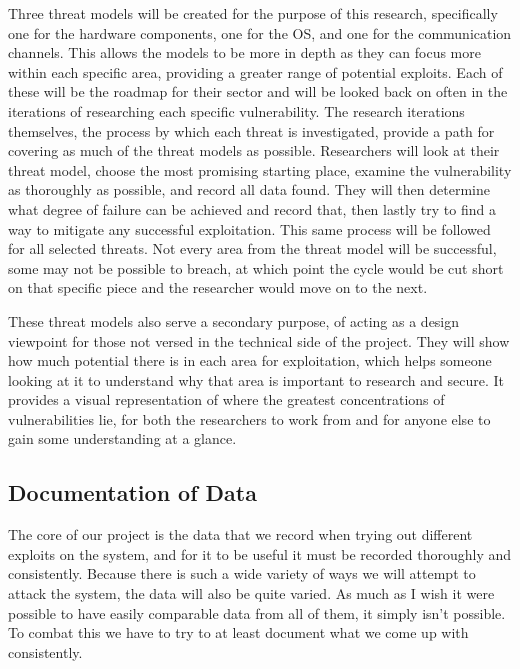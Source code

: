\documentclass[IEEEtran,letterpaper,10pt,notitlepage,draftclsnofoot,onecolumn]{article}
\begin{document}
Three threat models will be created for the purpose of this research, specifically one for the hardware components, one for the OS, and one for the communication channels.
This allows the models to be more in depth as they can focus more within each specific area, providing a greater range of potential exploits.
Each of these will be the roadmap for their sector and will be looked back on often in the iterations of researching each specific vulnerability.
The research iterations themselves, the process by which each threat is investigated, provide a path for covering as much of the threat models as possible.
Researchers will look at their threat model, choose the most promising starting place, examine the vulnerability as thoroughly as possible, and record all data found.
They will then determine what degree of failure can be achieved and record that, then lastly try to find a way to mitigate any successful exploitation.
This same process will be followed for all selected threats.
Not every area from the threat model will be successful, some may not be possible to breach, at which point the cycle would be cut short on that specific piece and the researcher would move on to the next.

These threat models also serve a secondary purpose, of acting as a design viewpoint for those not versed in the technical side of the project.
They will show how much potential there is in each area for exploitation, which helps someone looking at it to understand why that area is important to research and secure.
It provides a visual representation of where the greatest concentrations of vulnerabilities lie, for both the researchers to work from and for anyone else to gain some understanding at a glance.

\subsection{Documentation of Data}
The core of our project is the data that we record when trying out different exploits on the system, and for it to be useful it must be recorded thoroughly and consistently. 
Because there is such a wide variety of ways we will attempt to attack the system, the data will also be quite varied. 
As much as I wish it were possible to have easily comparable data from all of them, it simply isn't possible. 
To combat this we have to try to at least document what we come up with consistently.
\end{document}
